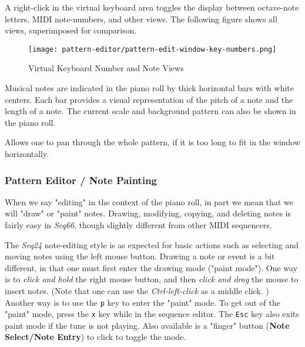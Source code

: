    A right-click in the virtual keyboard area toggles the display
   between octave-note letters, MIDI note-numbers, and other views.
   The following figure shows all views, superimposed for comparison.

\begin{figure}[H]
   \centering 
   \texttt{[image: pattern-editor/pattern-edit-window-key-numbers.png]}
   \caption{Virtual Keyboard Number and Note Views}
   \label{fig:pattern_editor_key_numbers}
\end{figure}

   Musical notes are indicated in the piano roll
   by thick horizontal bars with white
   centers.  Each bar provides
   a visual representation of the pitch of a note and the length of a note.
   The current scale and background pattern can also be shown in the piano
   roll.

   Allows one to pan through the whole pattern, if it is too long to fit in
   the window horizontally.

\subsubsection{Pattern Editor / Note Painting}
\label{subsubsec:pattern_editor_note_painting}

   When we say "editing" in the context of the piano roll, in part we mean that
   we will "draw"
   or "paint" notes.
   Drawing, modifying, copying, and deleting notes is fairly easy in
   \textsl{Seq66}, though slightly different from other MIDI sequencers.

   The \textsl{Seq24} note-editing style is as expected for basic
   actions such as selecting and moving notes using the left mouse button.
   Drawing a note or event is a bit different, in that one must first
   enter the drawing mode ("paint mode").
   One way is to \textsl{click and hold} the right mouse button, and then
   \textsl{click and drag} the mouse to insert notes.
   (Note that one can use the \textsl{Ctrl-left-click} as a middle click. )
   Another way is to use the \texttt{p} key to enter the "paint" mode.
   To get out of the "paint" mode, press the
   \texttt{x} key while in the sequence editor.
   The \texttt{Esc} key also exits paint mode if the tune is not playing.
   Also available is a "finger" button
   (\textbf{Note Select/Note Entry})
   to click to toggle the mode.

